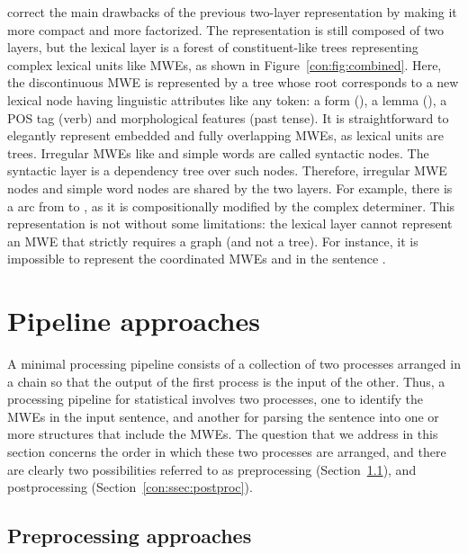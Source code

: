 \documentclass[output=paper]{langsci/langscibook}
\begin{document}
\citet{constantnivre16} correct the main drawbacks of the previous two-layer representation by making it more compact and more factorized. The representation is still composed of two layers, but the lexical layer is a forest of constituent-like trees representing complex lexical units like MWEs, as shown in Figure~\ref{con:fig:combined}.
Here, the discontinuous MWE  is represented by a tree whose root corresponds to a new lexical node having linguistic attributes like any token: a form (), a lemma (), a POS tag (verb) and morphological features (past tense).
It is straightforward to elegantly represent embedded and fully overlapping MWEs, as lexical units are trees.
Irregular MWEs like  and simple words are called syntactic nodes. The syntactic layer is a dependency tree over such nodes. Therefore, irregular MWE nodes and simple word nodes are shared by the two layers. For example, there is a  arc from  to , as it is compositionally modified by the complex determiner.  This representation is not without some limitations: the lexical layer cannot represent an MWE that strictly requires a graph (and not a tree). For instance, it is impossible to represent the coordinated MWEs  and  in the sentence . 






%
\section{Pipeline approaches}
\label{con:sec:pipeline}

A minimal processing pipeline consists of a collection of two processes arranged in a chain so that the output of the first process is the input of the other. Thus, a processing pipeline for statistical  involves two processes, one to identify the MWEs in the input sentence, and another for parsing the sentence into one or more structures that include the MWEs. The question that we address in this section concerns the order in which these two processes are arranged, and there are clearly two possibilities referred to as preprocessing (Section~\ref{con:ssec:preproc}), and postprocessing (Section~\ref{con:ssec:postproc}).

\subsection{Preprocessing approaches}
\label{con:ssec:preproc}
\end{document}
